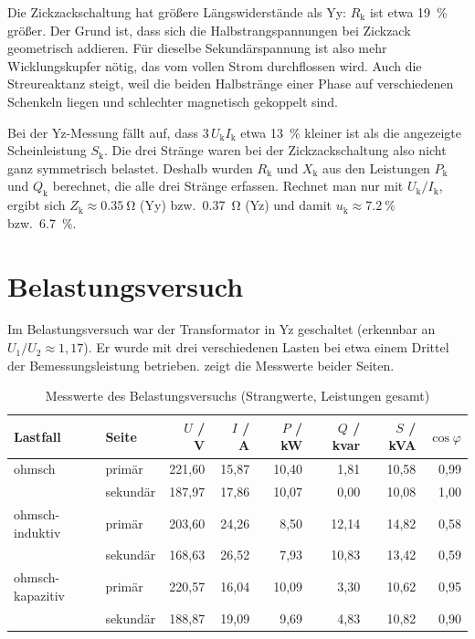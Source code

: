 \documentclass[a4paper,11pt]{scrreprt}
\begin{document}
Die Zickzackschaltung hat größere Längswiderstände als Yy: $R_\mathrm{k}$ ist etwa \SI{19}{\percent} größer. Der Grund ist, dass sich die Halbstrangspannungen bei Zickzack geometrisch addieren. Für dieselbe Sekundärspannung ist also mehr Wicklungskupfer nötig, das vom vollen Strom durchflossen wird. Auch die Streureaktanz steigt, weil die beiden Halbstränge einer Phase auf verschiedenen Schenkeln liegen und schlechter magnetisch gekoppelt sind.

Bei der Yz-Messung fällt auf, dass $3\,U_\mathrm{k}I_\mathrm{k}$ etwa \SI{13}{\percent} kleiner ist als die angezeigte Scheinleistung $S_\mathrm{k}$. Die drei Stränge waren bei der Zickzackschaltung also nicht ganz symmetrisch belastet. Deshalb wurden $R_\mathrm{k}$ und $X_\mathrm{k}$ aus den Leistungen $P_\mathrm{k}$ und $Q_\mathrm{k}$ berechnet, die alle drei Stränge erfassen. Rechnet man nur mit $U_\mathrm{k}/I_\mathrm{k}$, ergibt sich $Z_\mathrm{k}\approx\SI{0.35}{\ohm}$ (Yy) bzw.\ \SI{0.37}{\ohm} (Yz) und damit $u_\mathrm{k}\approx\SI{7.2}{\percent}$ bzw.\ \SI{6.7}{\percent}.

\section{Belastungsversuch}

Im Belastungsversuch war der Transformator in Yz geschaltet (erkennbar an $U_1/U_2 \approx 1{,}17$). Er wurde mit drei verschiedenen Lasten bei etwa einem Drittel der Bemessungsleistung betrieben.  zeigt die Messwerte beider Seiten.

\begin{table}[H]
\centering
\small
\setlength{\tabcolsep}{4pt}
\caption{Messwerte des Belastungsversuchs (Strangwerte, Leistungen gesamt)}
\label{tab:bel}
\begin{tabular}{@{}llrrrrrr@{}}
\toprule
Lastfall & Seite & $U$ / V & $I$ / A & $P$ / kW & $Q$ / kvar & $S$ / kVA & $\cos\varphi$\\
\midrule
ohmsch & primär & 221,60 & 15,87 & 10,40 & 1,81 & 10,58 & 0,99\\
 & sekundär & 187,97 & 17,86 & 10,07 & 0,00 & 10,08 & 1,00\\
\midrule
ohmsch-induktiv & primär & 203,60 & 24,26 & 8,50 & 12,14 & 14,82 & 0,58\\
 & sekundär & 168,63 & 26,52 & 7,93 & 10,83 & 13,42 & 0,59\\
\midrule
ohmsch-kapazitiv & primär & 220,57 & 16,04 & 10,09 & 3,30 & 10,62 & 0,95\\
 & sekundär & 188,87 & 19,09 & 9,69 & 4,83 & 10,82 & 0,90\\
\bottomrule
\end{tabular}
\end{table}
\end{document}
